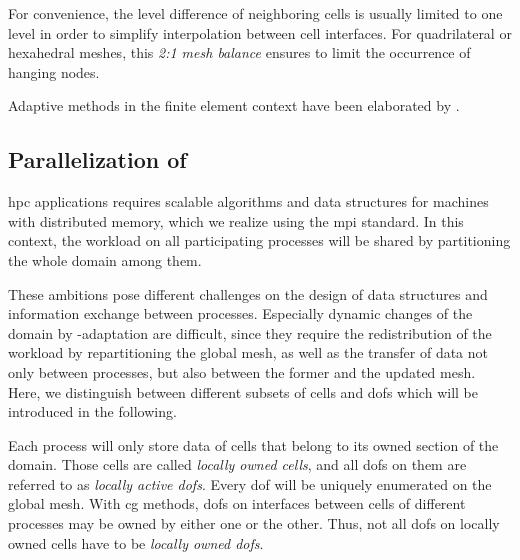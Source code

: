 For convenience, the level difference of neighboring cells is usually limited to one level in order to simplify interpolation between cell interfaces. For quadrilateral or hexahedral meshes, this \textit{2:1 mesh balance} ensures to limit the occurrence of hanging nodes.

Adaptive methods in the finite element context have been elaborated by \textcites{bangerth2003}{bangerth2009}.






\subsection{Parallelization of }

\Gls{hpc} applications requires scalable algorithms and data structures for machines with distributed memory, which we realize using the \gls{mpi} standard. In this context, the workload on all participating processes will be shared by partitioning the whole domain among them.

These ambitions pose different challenges on the design of data structures and information exchange between processes. Especially dynamic changes of the domain by \hp-adaptation are difficult, since they require the redistribution of the workload by repartitioning the global mesh, as well as the transfer of data not only between processes, but also between the former and the updated mesh. Here, we distinguish between different subsets of cells and \glspl{dof} which will be introduced in the following.

Each process will only store data of cells that belong to its owned section of the domain. Those cells are called \textit{locally owned cells}, and all \glspl{dof} on them are referred to as \textit{locally active \glspl{dof}}. Every \gls{dof} will be uniquely enumerated on the global mesh. With \gls{cg} methods, \glspl{dof} on interfaces between cells of different processes may be owned by either one or the other. Thus, not all \glspl{dof} on locally owned cells have to be \textit{locally owned \glspl{dof}}.

